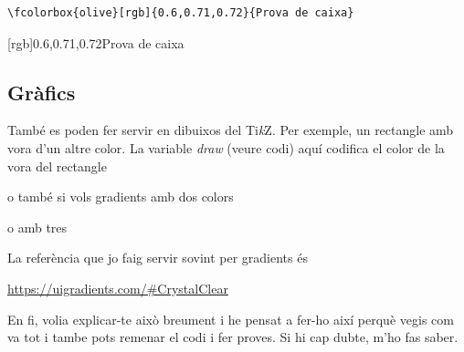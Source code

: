 \documentclass[a4paper,12pt]{article}
\begin{document}
\begin{verbatim}
\fcolorbox{olive}[rgb]{0.6,0.71,0.72}{Prova de caixa}
\end{verbatim}

[rgb]{0.6,0.71,0.72}{Prova de caixa}

\subsection{Gràfics}
També es poden fer servir en dibuixos del Ti\textit{k}Z. Per exemple, un rectangle amb vora d'un altre color. La variable \emph{draw} (veure codi) aquí codifica el color de la vora del rectangle
\begin{center}
\end{center}

o també si vols gradients amb dos colors

\begin{center}
\end{center}
o amb tres

\begin{center}
\end{center}

\begin{center}
\end{center}

La referència que jo faig servir sovint per gradients és

\url{https://uigradients.com/#CrystalClear}

En fi, volia explicar-te això breument i he pensat a fer-ho així perquè vegis com va tot i tambe pots remenar el codi i fer proves. Si hi cap dubte, m'ho fas saber.
\end{document}
